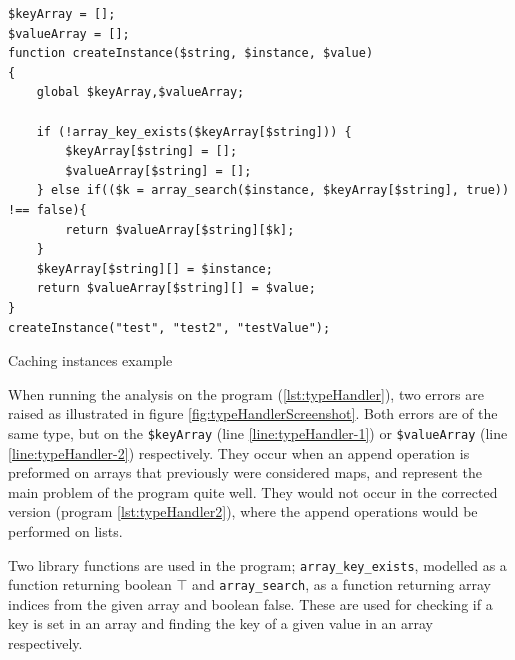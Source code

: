 \begin{program}
\begin{lstlisting}
$keyArray = [];
$valueArray = [];
function createInstance($string, $instance, $value)
{
    global $keyArray,$valueArray;

    if (!array_key_exists($keyArray[$string])) { 
        $keyArray[$string] = [];
        $valueArray[$string] = [];
    } else if(($k = array_search($instance, $keyArray[$string], true)) !== false){
        return $valueArray[$string][$k];
    }
    $keyArray[$string][] = $instance;
    return $valueArray[$string][] = $value;
}
createInstance("test", "test2", "testValue");
\end{lstlisting}
\caption{Caching instances example}
\label{lst:typeHandler2}
\end{program}

When running the analysis on the program (\ref{lst:typeHandler}), two errors are raised as illustrated in figure \ref{fig:typeHandlerScreenshot}. Both errors are of the same type, but on the \texttt{\$keyArray} (line \ref{line:typeHandler-1}) or \texttt{\$valueArray} (line \ref{line:typeHandler-2}) respectively. They occur when an append operation is preformed on arrays that previously were considered maps, and represent the main problem of the program quite well. They would not occur in the corrected version (program \ref{lst:typeHandler2}), where the append operations would be performed on lists.

Two library functions are used in the program; \texttt{array\_key\_exists}, modelled as a function returning boolean $\top$ and \texttt{array\_search}, as a function returning array indices from the given array and boolean false. These are used for checking if a key is set in an array and finding the key of a given value in an array respectively.

